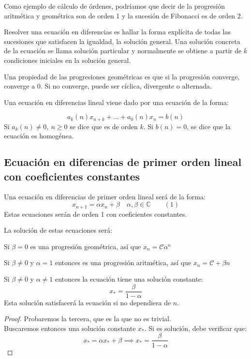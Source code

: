 Como ejemplo de cálculo de órdenes, podríamos que decir de la progresión aritmética y geométrica son de orden 1 y la sucesión de Fibonacci es de orden 2.

\begin{ndef}
	Resolver una ecuación en diferencias es hallar la forma explícita de todas las sucesiones que satisfacen la igualdad, la solución general. Una solución concreta de la ecuación se llama solución particular y normalmente se obtiene a partir de $k$ condiciones iniciales en la solución general.
\end{ndef}

\begin{nota}
	Una propiedad de las progresiones geométricas es que si la progresión converge, converge a 0. Si no converge, puede ser cíclica, divergente o alternada.
\end{nota}

\begin{ndef}
	Una ecuación en diferencias lineal viene dado por una ecuación de la forma:

\[
a_k(n)x_{n+k} + ... + a_0(n)x_n = b(n)
\]
Si $a_k(n)\ne 0, \ n \geq 0$ se dice que es de orden $k$. Si $b(n) = 0$, se dice que la ecuación es homogénea.
\end{ndef}


\subsection[E.D. primer orden coef. const.]{Ecuación en diferencias de primer orden lineal con coeficientes constantes}

Una ecuación en diferencias de primer orden lineal será de la forma:
\[
x_{n+1} = \alpha x_n +  \beta \quad \alpha,\beta \in \mathbb{C}\quad \quad (1)
\]
Estas ecuaciones serán de orden 1 con coeficientes constantes.

\begin{nprop}
	La solución de estas ecuaciones será:
	\begin{nlist}
	\item Si $\beta = 0$ es una progresión geométrica, así que $x_n =  \mathcal{C} \alpha^n$
	\item Si $\beta \ne 0$ y $\alpha  = 1$ entonces es una progresión aritmética, así que $x_n = \mathcal{C} + \beta n$
	\item Si $\beta \ne 0 $ y $\alpha \ne 1 $ entonces la ecuación tiene una solución constante:
	\[
	x_* = \frac{\beta}{1-\alpha}
	\]
	Esta solución satisfacerá la ecuación si no dependiera de $n$.
\end{nlist}
\end{nprop}
\begin{proof}
	Probaremos la tercera, que es la que no es trivial.\\
	Buscaremos entonces una solución constante $x_*$. Si es solución, debe verificar que:
$$x_* =  \alpha x_* + \beta \implies  x_* = \dfrac{\beta}{1 - \alpha}$$
\end{proof}

